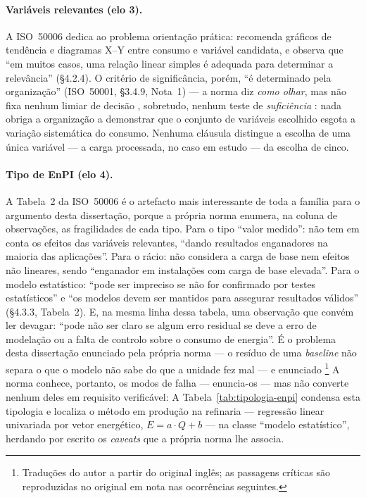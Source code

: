\paragraph{Variáveis relevantes (elo 3).} A ISO~50006 dedica ao problema orientação prática: recomenda gráficos de tendência e diagramas X--Y entre consumo e variável candidata, e observa que \enquote{em muitos casos, uma relação linear simples é adequada para determinar a relevância} (\S4.2.4). O critério de significância, porém, \enquote{é determinado pela organização} (ISO~50001, \S3.4.9, Nota~1) --- a norma diz \emph{como olhar}, mas não fixa nenhum limiar de decisão , sobretudo, nenhum
teste de \emph{suficiência} : nada obriga a organização a demonstrar que o conjunto de variáveis escolhido esgota a variação sistemática do consumo. Nenhuma cláusula distingue a escolha de uma única variável --- a carga processada, no caso em estudo --- da escolha de cinco.

\paragraph{Tipo de EnPI (elo 4).} A Tabela~2 da ISO~50006 é o artefacto mais interessante de toda a família para o argumento desta dissertação, porque a própria norma enumera, na coluna de observações, as fragilidades de cada tipo. Para o tipo \enquote{valor medido}: não tem em conta os efeitos das variáveis relevantes, \enquote{dando resultados enganadores na maioria das aplicações}. Para o rácio: não considera a carga de base nem efeitos não lineares, sendo \enquote{enganador em instalações com carga de base elevada}. Para o modelo estatístico: \enquote{pode ser impreciso se não for confirmado por testes estatísticos} e \enquote{os modelos devem ser mantidos para assegurar resultados válidos} (\S4.3.3, Tabela~2). E, na mesma linha dessa tabela, uma observação que convém ler devagar: \enquote{pode não ser claro se algum erro residual se deve a erro de modelação ou a falta de controlo sobre o consumo de energia}. É o problema desta dissertação enunciado pela própria norma --- o resíduo de uma \emph{baseline} não separa o que o modelo não sabe do que a unidade fez mal --- e enunciado \footnote{Traduções do autor a partir do original inglês; as passagens críticas são reproduzidas no original em nota nas ocorrências seguintes.} A norma conhece, portanto, os modos de falha --- enuncia-os --- mas não converte nenhum deles em requisito verificável:  A Tabela~\ref{tab:tipologia-enpi} condensa esta tipologia e localiza o método em produção na refinaria --- regressão linear univariada por vetor energético, $E = a \cdot Q + b$ --- na classe \enquote{modelo estatístico}, herdando por escrito os \emph{caveats} que a própria norma lhe associa.

